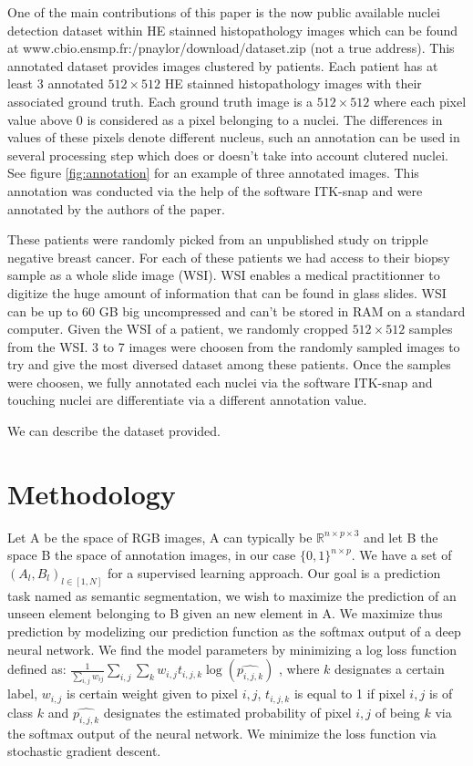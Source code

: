\documentclass{article}
\begin{document}
One of the main contributions of this paper is the now public available 
nuclei detection dataset within HE stainned histopathology images which 
can be found at www.cbio.ensmp.fr:/pnaylor/download/dataset.zip (not 
a true address). This annotated dataset provides images clustered by 
patients. Each patient has at least 3 annotated $512 \times 512$ HE 
stainned histopathology images with their associated ground truth. Each 
ground truth image is a $512 \times 512$ where each pixel value above 
$0$ is considered as a pixel belonging to a nuclei. The differences in 
values of these pixels denote different nucleus, such an annotation can 
be used in several processing step which does or doesn't take into 
account clutered nuclei. See figure \ref{fig:annotation} for an example of 
three annotated images. This annotation was conducted via the help of 
the software ITK-snap and were annotated by the authors of the paper.


These patients were randomly picked from an unpublished study on
tripple negative breast cancer. For each of these patients we had access
to their biopsy sample as a whole slide image (WSI). WSI enables a
medical practitionner to digitize the huge amount of information that
can be found in glass slides. WSI can be up to 60 GB big
uncompressed and can't be stored in RAM on a standard computer. Given
the WSI of a patient, we randomly cropped $512 \times 512$ samples 
from the WSI. %
3 to 7 images were choosen from the randomly sampled images to try and give the most diversed dataset among these patients. Once the samples were choosen, we fully annotated each nuclei via the software ITK-snap and touching nuclei are differentiate via a different annotation value.

We can describe the dataset provided.


\section{Methodology}
\label{sec:method}
Let A be the space of RGB images, A can typically be 
$\mathbb{R}^{n \times p \times 3}$ and let B the space B the space of annotation 
images, in our case $\{0,1\}^{n \times p}$. We have a set of 
$(A_l,B_l)_{l \in [1, N]}$ for a supervised learning approach. Our goal is 
a prediction task 
named as semantic segmentation, we wish to maximize the prediction of 
an unseen element belonging to B given an new element in A. We maximize 
thus prediction by modelizing our prediction function as the softmax output of a deep neural 
network. We find the model parameters by minimizing a log loss function 
defined as:
 $\frac{1}{\sum_{i,j}w_{ij}} \sum_{i,j} \sum_k w_{i,j} t_{i,j,k} \log (\widehat{p_{i,j,k}})$
, where $k$ designates a certain label, $w_{i,j}$ is 
certain weight given to pixel $i,j$, $t_{i,j,k}$ is equal to 1 if pixel $i,j$ is 
of class $k$ and $\widehat{p_{i,j,k}}$ designates the estimated probability 
of pixel $i,j$ of being $k$ via the softmax output of the neural network.
We minimize the loss function via stochastic gradient descent.
\end{document}
